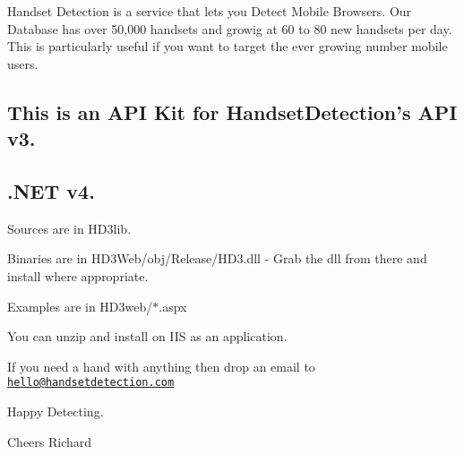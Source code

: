 Handset Detection is a service that lets you Detect Mobile Browsers. Our Database has over 50,000 handsets and growig at 60 to 80 new handsets per day. This is particularly useful if you want to target the ever growing number mobile users.

\subsection*{This is an A\+P\+I Kit for Handset\+Detection's A\+P\+I v3.}

\subsection*{.N\+E\+T v4.}

Sources are in H\+D3lib.

Binaries are in H\+D3\+Web/obj/\+Release/\+H\+D3.\+dll -\/ Grab the dll from there and install where appropriate.

Examples are in H\+D3web/$\ast$.aspx

You can unzip and install on I\+I\+S as an application.

If you need a hand with anything then drop an email to \href{mailto:hello@handsetdetection.com}{\tt hello@handsetdetection.\+com}

Happy Detecting.

Cheers Richard 